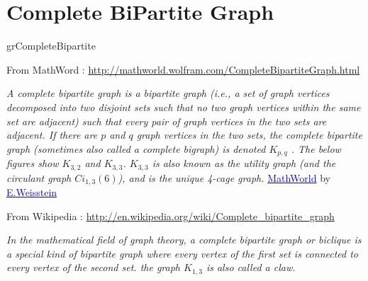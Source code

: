 \newpage\section{Complete BiPartite Graph}\label{bipart}
\begin{NewMacroBox}{grCompleteBipartite}{}

\medskip
From MathWord : \url{http://mathworld.wolfram.com/CompleteBipartiteGraph.html}

\emph{A complete bipartite graph is a bipartite graph (i.e., a set of graph vertices decomposed into two disjoint sets such that no two graph vertices within the same set are adjacent) such that every pair of graph vertices in the two sets are adjacent. If there are $p$ and $q$ graph vertices in the two sets, the complete bipartite graph (sometimes also called a complete bigraph) is denoted $K_{p,q}$ . The below figures show $K_{3,2}$ and $K_{3,3}$. $K_{3,3}$ is also known as the utility graph (and the circulant graph $Ci_{1,3}(6)$), and is the unique 4-cage graph.} 
\href{http://mathworld.wolfram.com/topics/GraphTheory.html}%
           {\textcolor{blue}{MathWorld}} by \href{http://en.wikipedia.org/wiki/Eric_W._Weisstein}%
           {\textcolor{blue}{E.Weisstein}}

\medskip
From Wikipedia : \url{http://en.wikipedia.org/wiki/Complete_bipartite_graph}

\emph{In the mathematical field of graph theory, a complete bipartite graph or biclique is a special kind of bipartite graph where every vertex of the first set is connected to every vertex of the second set. the graph $K_{1,3}$ is also called a claw.}
\end{NewMacroBox}

\subsection{ }
\begin{center}
\begin{tkzexample}[vbox]
 \hspace*{2cm}
\end{tkzexample}
\end{center}

